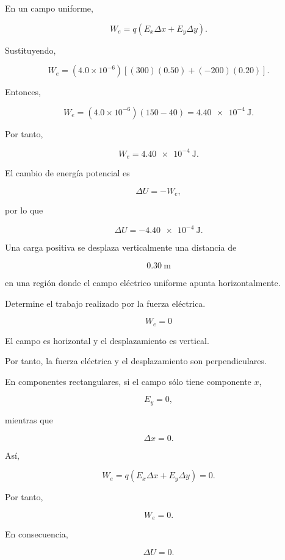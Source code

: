 \begin{explicacion}

En un campo uniforme,

\[
W_e=q(E_x\Delta x+E_y\Delta y).
\]

Sustituyendo,

\[
W_e
=
(4.0\times10^{-6})
\left[
(300)(0.50)+(-200)(0.20)
\right].
\]

Entonces,

\[
W_e
=
(4.0\times10^{-6})(150-40)
=
\SI{4.40e-4}{\joule}.
\]

Por tanto,

\[
\boxed{W_e=\SI{4.40e-4}{\joule}}.
\]

El cambio de energía potencial es

\[
\Delta U=-W_e,
\]

por lo que

\[
\boxed{\Delta U=-\SI{4.40e-4}{\joule}}.
\]

\end{explicacion}


\begin{ejercicio}

Una carga positiva se desplaza verticalmente una distancia de

\[
\SI{0.30}{\metre}
\]

en una región donde el campo eléctrico uniforme apunta horizontalmente.

Determine el trabajo realizado por la fuerza eléctrica.

\end{ejercicio}

\begin{respuesta}

\[
\boxed{W_e=0}
\]

\end{respuesta}

\begin{explicacion}

El campo es horizontal y el desplazamiento es vertical.

Por tanto, la fuerza eléctrica y el desplazamiento son perpendiculares.

En componentes rectangulares, si el campo sólo tiene componente \(x\),

\[
E_y=0,
\]

mientras que

\[
\Delta x=0.
\]

Así,

\[
W_e=q(E_x\Delta x+E_y\Delta y)=0.
\]

Por tanto,

\[
\boxed{W_e=0}.
\]

En consecuencia,

\[
\Delta U=0.
\]

\end{explicacion}



